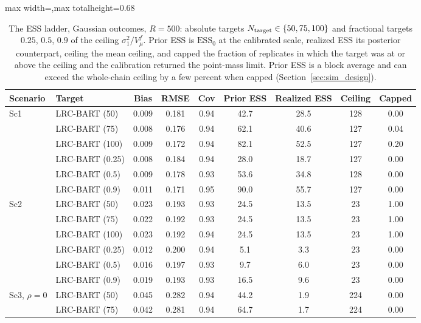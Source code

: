 \begin{table}[htbp]
\centering
\singlespacing
\caption{The ESS ladder, Gaussian outcomes, $R=500$: absolute targets $N_{\rm target}\in\{50,75,100\}$ and fractional targets $0.25$, $0.5$, $0.9$ of the ceiling $\sigma_1^2/V_\mu^f$. Prior ESS is $\mathrm{ESS}_0$ at the calibrated scale, realized ESS its posterior counterpart, ceiling the mean ceiling, and capped the fraction of replicates in which the target was at or above the ceiling and the calibration returned the point-mass limit. Prior ESS is a block average and can exceed the whole-chain ceiling by a few percent when capped (Section~\ref{sec:sim_design}).}
\label{tab:ladder}
\scriptsize
\setlength{\tabcolsep}{4pt}
\renewcommand{\arraystretch}{0.8}
\begin{adjustbox}{max width=\textwidth,max totalheight=0.68\textheight}
\begin{tabular}{llccccccc}
\toprule
Scenario & Target & Bias & RMSE & Cov & Prior ESS & Realized ESS & Ceiling & Capped \\
\midrule
\multirow{6}{*}{Sc1} & LRC-BART (50) & 0.009 & 0.181 & 0.94 & 42.7 & 28.5 & 128 & 0.00 \\
& LRC-BART (75) & 0.008 & 0.176 & 0.94 & 62.1 & 40.6 & 127 & 0.04 \\
& LRC-BART (100) & 0.009 & 0.172 & 0.94 & 82.1 & 52.5 & 127 & 0.20 \\
& LRC-BART (0.25) & 0.008 & 0.184 & 0.94 & 28.0 & 18.7 & 127 & 0.00 \\
& LRC-BART (0.5) & 0.009 & 0.178 & 0.93 & 53.6 & 34.8 & 128 & 0.00 \\
& LRC-BART (0.9) & 0.011 & 0.171 & 0.95 & 90.0 & 55.7 & 127 & 0.00 \\
\midrule
\multirow{6}{*}{Sc2} & LRC-BART (50) & 0.023 & 0.193 & 0.93 & 24.5 & 13.5 & 23 & 1.00 \\
& LRC-BART (75) & 0.022 & 0.192 & 0.93 & 24.5 & 13.5 & 23 & 1.00 \\
& LRC-BART (100) & 0.023 & 0.192 & 0.94 & 24.5 & 13.5 & 23 & 1.00 \\
& LRC-BART (0.25) & 0.012 & 0.200 & 0.94 & 5.1 & 3.3 & 23 & 0.00 \\
& LRC-BART (0.5) & 0.016 & 0.197 & 0.93 & 9.7 & 6.0 & 23 & 0.00 \\
& LRC-BART (0.9) & 0.019 & 0.193 & 0.93 & 16.5 & 9.6 & 23 & 0.00 \\
\midrule
\multirow{6}{*}{Sc3, $\rho=0$} & LRC-BART (50) & 0.045 & 0.282 & 0.94 & 44.2 & 1.9 & 224 & 0.00 \\
& LRC-BART (75) & 0.042 & 0.281 & 0.94 & 64.7 & 1.7 & 224 & 0.00 \\

\end{tabular}
\end{adjustbox}
\end{table}
